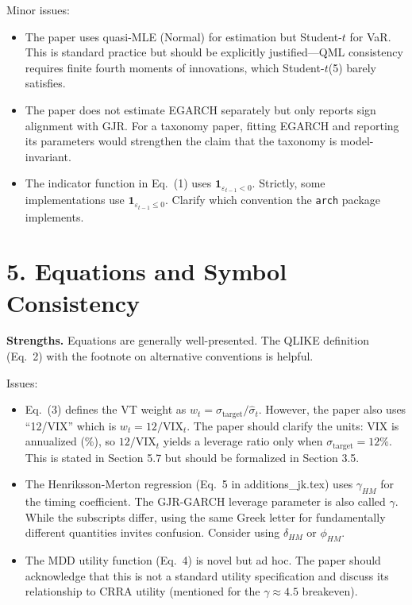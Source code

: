 \documentclass[12pt,a4paper]{article}
\begin{document}
Minor issues:
\begin{itemize}[nosep]
\item The paper uses quasi-MLE (Normal) for estimation but Student-$t$ for VaR. This is standard practice but should be explicitly justified---QML consistency requires finite fourth moments of innovations, which Student-$t$(5) barely satisfies.
\item The paper does not estimate EGARCH separately but only reports sign alignment with GJR. For a taxonomy paper, fitting EGARCH and reporting its parameters would strengthen the claim that the taxonomy is model-invariant.
\item The indicator function in Eq.~(1) uses $\mathbf{1}_{\varepsilon_{t-1}<0}$. Strictly, some implementations use $\mathbf{1}_{\varepsilon_{t-1}\leq 0}$. Clarify which convention the \texttt{arch} package implements.
\end{itemize}

\bigskip

\section*{5. Equations and Symbol Consistency}

\textcolor{okgreen}{\textbf{Strengths.}} Equations are generally well-presented. The QLIKE definition (Eq.~2) with the footnote on alternative conventions is helpful.

Issues:
\begin{itemize}[nosep]
\item Eq.~(3) defines the VT weight as $w_t = \sigma_{\text{target}} / \hat{\sigma}_t$. However, the paper also uses ``12/VIX'' which is $w_t = 12 / \text{VIX}_t$. The paper should clarify the units: VIX is annualized (\%), so $12/\text{VIX}_t$ yields a leverage ratio only when $\sigma_{\text{target}} = 12\%$. This is stated in Section 5.7 but should be formalized in Section 3.5.
\item The Henriksson-Merton regression (Eq.~5 in additions\_jk.tex) uses $\gamma_{HM}$ for the timing coefficient. The GJR-GARCH leverage parameter is also called $\gamma$. While the subscripts differ, using the same Greek letter for fundamentally different quantities invites confusion. Consider using $\delta_{HM}$ or $\phi_{HM}$.
\item The MDD utility function (Eq.~4) is novel but ad hoc. The paper should acknowledge that this is not a standard utility specification and discuss its relationship to CRRA utility (mentioned for the $\gamma \approx 4.5$ breakeven).
\end{itemize}
\end{document}

